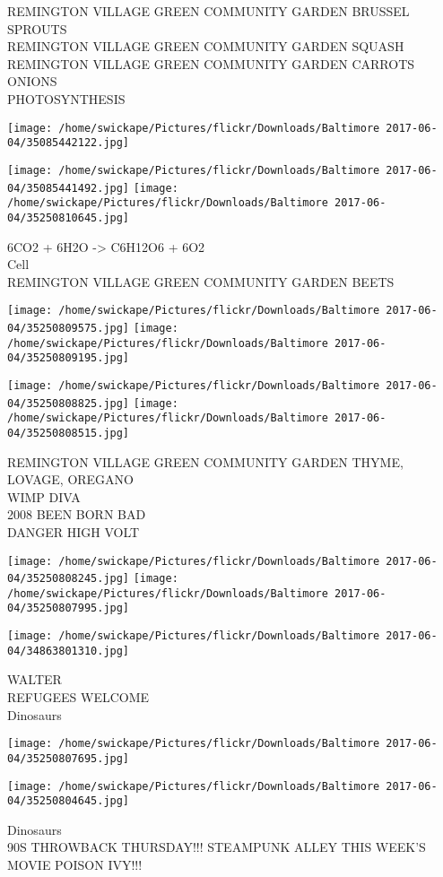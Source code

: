 \documentclass[10pt,letterpaper]{article}
\begin{document}
REMINGTON VILLAGE GREEN COMMUNITY GARDEN BRUSSEL SPROUTS\\
REMINGTON VILLAGE GREEN COMMUNITY GARDEN SQUASH\\
REMINGTON VILLAGE GREEN COMMUNITY GARDEN CARROTS ONIONS\\
PHOTOSYNTHESIS
\pagebreak

\texttt{[image: /home/swickape/Pictures/flickr/Downloads/Baltimore 2017-06-04/35085442122.jpg]}

\vspace{0.25in}
\texttt{[image: /home/swickape/Pictures/flickr/Downloads/Baltimore 2017-06-04/35085441492.jpg]}
\texttt{[image: /home/swickape/Pictures/flickr/Downloads/Baltimore 2017-06-04/35250810645.jpg]}

6CO2 + 6H2O {-}> C6H12O6 + 6O2\\
Cell\\
REMINGTON VILLAGE GREEN COMMUNITY GARDEN BEETS
\pagebreak

\texttt{[image: /home/swickape/Pictures/flickr/Downloads/Baltimore 2017-06-04/35250809575.jpg]}
\texttt{[image: /home/swickape/Pictures/flickr/Downloads/Baltimore 2017-06-04/35250809195.jpg]}

\texttt{[image: /home/swickape/Pictures/flickr/Downloads/Baltimore 2017-06-04/35250808825.jpg]}
\texttt{[image: /home/swickape/Pictures/flickr/Downloads/Baltimore 2017-06-04/35250808515.jpg]}

REMINGTON VILLAGE GREEN COMMUNITY GARDEN THYME, LOVAGE, OREGANO\\
WIMP DIVA\\
2008 BEEN BORN BAD\\
DANGER HIGH VOLT
\pagebreak

\texttt{[image: /home/swickape/Pictures/flickr/Downloads/Baltimore 2017-06-04/35250808245.jpg]}
\texttt{[image: /home/swickape/Pictures/flickr/Downloads/Baltimore 2017-06-04/35250807995.jpg]}

\vspace{0.25in}
\texttt{[image: /home/swickape/Pictures/flickr/Downloads/Baltimore 2017-06-04/34863801310.jpg]}

WALTER\\
REFUGEES WELCOME\\
Dinosaurs
\pagebreak

\texttt{[image: /home/swickape/Pictures/flickr/Downloads/Baltimore 2017-06-04/35250807695.jpg]}

\vspace{0.25in}
\texttt{[image: /home/swickape/Pictures/flickr/Downloads/Baltimore 2017-06-04/35250804645.jpg]}

Dinosaurs\\
90S THROWBACK THURSDAY!!! STEAMPUNK ALLEY THIS WEEK'S MOVIE POISON IVY!!!
\pagebreak
\end{document}
